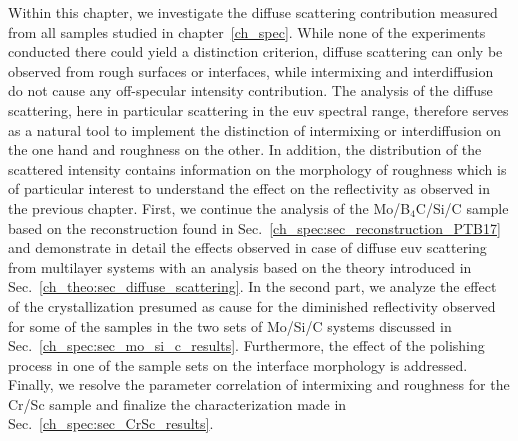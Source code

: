 Within this chapter, we investigate the diffuse scattering contribution measured from all samples studied in chapter~\ref{ch_spec}. While none of the experiments conducted there could yield a distinction criterion, diffuse scattering can only be observed from rough surfaces or interfaces, while intermixing and interdiffusion do not cause any off-specular intensity contribution. The analysis of the diffuse scattering, here in particular scattering in the \gls{euv} spectral range, therefore serves as a natural tool to implement the distinction of intermixing or interdiffusion on the one hand and roughness on the other. In addition, the distribution of the scattered intensity contains information on the morphology of roughness which is of particular interest to understand the effect on the reflectivity as observed in the previous chapter. First, we continue the analysis of the Mo/B$_4$C/Si/C sample based on the reconstruction found in Sec.~\ref{ch_spec:sec_reconstruction_PTB17} and demonstrate in detail the effects observed in case of diffuse \gls{euv} scattering from multilayer systems with an analysis based on the theory introduced in Sec.~\ref{ch_theo:sec_diffuse_scattering}. In the second part, we analyze the effect of the crystallization presumed as cause for the diminished reflectivity observed for some of the samples in the two sets of Mo/Si/C systems discussed in Sec.~\ref{ch_spec:sec_mo_si_c_results}. Furthermore, the effect of the polishing process in one of the sample sets on the interface morphology is addressed. Finally, we resolve the parameter correlation of intermixing and roughness for the Cr/Sc sample and finalize the characterization made in Sec.~\ref{ch_spec:sec_CrSc_results}.


